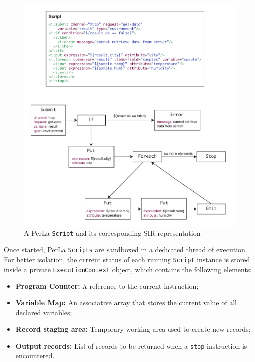 \begin{figure}[h!]
\includegraphics[width=\textwidth]{imgs/script_sir.pdf}
\caption{A PerLa \texttt{Script} and its corresponding SIR representation}
\end{figure}

Once started, PerLa \texttt{Scripts} are sandboxed in a dedicated thread of
execution. For better isolation, the current status of each running
\texttt{Script} instance is stored inside a private \texttt{ExecutionContext}
object, which contains the following elements:

\begin{itemize}

    \item \textbf{Program Counter:} A reference to the current instruction;

    \item \textbf{Variable Map:} An associative array that stores the current
        value of all declared variables;

    \item \textbf{Record staging area:} Temporary working area used to create
        new records;

    \item \textbf{Output records:} List of records to be returned when a
        \texttt{stop} instruction is encountered. 

\end{itemize}

